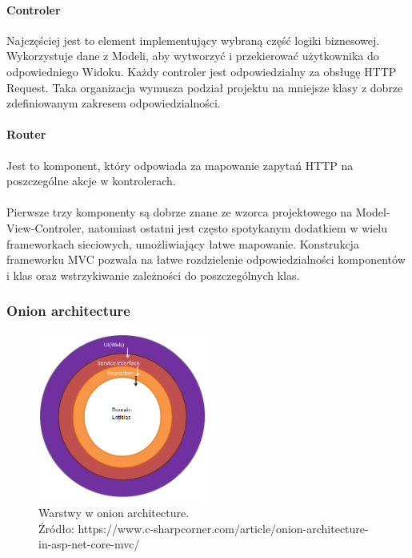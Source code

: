 \documentclass{article}
\begin{document}
\paragraph{Controler}
Najczęściej jest to element implementujący wybraną część logiki biznesowej. Wykorzystuje dane z Modeli, aby wytworzyć i przekierować użytkownika do odpowiedniego Widoku. Każdy controler jest odpowiedzialny za obsługę HTTP Request. Taka organizacja wymusza podział projektu na mniejsze klasy z dobrze zdefiniowanym zakresem odpowiedzialności.

\paragraph{Router}
Jest to komponent, który odpowiada za mapowanie zapytań HTTP na poszczególne akcje w kontrolerach.
\\\\
Pierwsze trzy komponenty są dobrze znane ze wzorca projektowego na Model-View-Controler, natomiast ostatni jest często spotykanym dodatkiem w wielu frameworkach sieciowych, umożliwiający łatwe mapowanie. Konstrukcja frameworku MVC pozwala na łatwe rozdzielenie odpowiedzialności komponentów i klas oraz wstrzykiwanie zależności do poszczególnych klas.

\subsubsection{Onion architecture}

\begin{figure}
\centering
	\includegraphics[width=0.50\textwidth]{onion.png}
	\caption[caption]{Warstwy w onion architecture.\\\hspace{\textwidth}Źródło: https://www.c-sharpcorner.com/article/onion-architecture-in-asp-net-core-mvc/}
	\label{fig:onion}
\end{figure}
\end{document}
